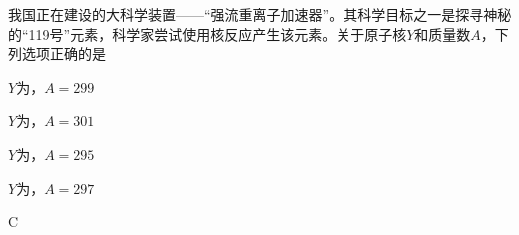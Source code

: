 我国正在建设的大科学装置——“强流重离子加速器”。其科学目标之一是探寻神秘的“119号”元素，科学家尝试使用核反应产生该元素。关于原子核\(Y\)和质量数\(A\)，下列选项正确的是\paren[]
\begin{choices}
	\item \(Y\)为，\(A = 299\)
	\item \(Y\)为，\(A = 301\)
	\item \(Y\)为，\(A = 295\)
	\item \(Y\)为，\(A = 297\)
\end{choices}
\begin{answer}
	C
\end{answer}